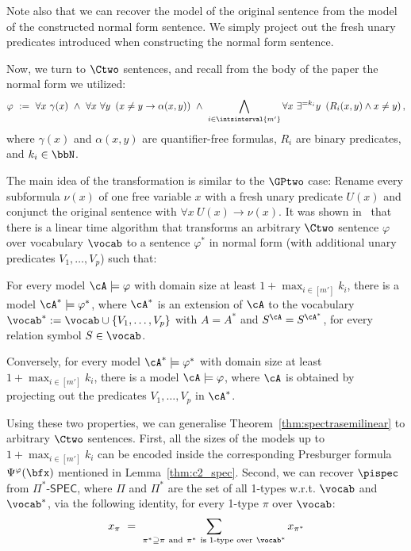 Note also that we can recover the model of the original sentence from the model of the constructed normal form sentence.
We simply project out the fresh unary predicates introduced when constructing the normal form sentence. 

Now, we turn to $\Ctwo$ sentences, and recall from the body of the paper the normal form we utilized:
\begin{equation*}
    \varphi\ :=\ 
    \forall x\ \gamma(x)\ \land\ 
    \forall x\ \forall y\ \left(x \neq y \to \alpha(x, y)\right)\ \land\ 
    \bigwedge_{i \in \intsinterval{m'}} \forall x\ \exists^{=k_i} y\ \left(R_i(x,y) \land x \neq y\right),
\end{equation*}
where $\gamma(x)$ and $\alpha(x, y)$ are quantifier-free formulas,
$R_i$ are binary predicates,
and $k_i \in \bbN$.
 
The main idea of the transformation is similar to the $\GPtwo$ case:
Rename every subformula $\nu(x)$ of one free variable $x$ with a fresh unary predicate $U(x)$ and conjunct the original sentence with $\forall x\  U(x)\to \nu(x)$.
It was shown in~\cite{ctwocomplexity,ianrevisited} that there is a linear time algorithm that transforms
an arbitrary $\Ctwo$ sentence $\varphi$ over vocabulary $\vocab$ to a sentence $\varphi^*$ in normal form (with additional unary predicates $V_1,\ldots,V_p$) such that:
\begin{compactitem}
\item 
For every model $\cA\models \varphi$ with domain size at least $1+\max_{i\in[m']}k_i$,
there is a model $\cA^*\models \varphi^*$, where $\cA^*$ is an extension of $\cA$ to the vocabulary $\vocab^*:=\vocab\cup\{V_1,\ldots,V_p\}$ with
$A=A^*$ and $S^{\cA}=S^{\cA^*}$, for every relation symbol $S\in\vocab$.
\item
Conversely,
for every model $\cA^*\models \varphi^*$ with domain size at least $1+\max_{i\in[m']}k_i$,
there is a model $\cA\models \varphi$, where $\cA$ is obtained by projecting out the predicates $V_1,\ldots,V_p$ in $\cA^*$.
\end{compactitem}
Using these two properties, we can generalise Theorem~\ref{thm:spectrasemilinear} to arbitrary $\Ctwo$ sentences.
First, all the sizes of the models up to 
$1+\max_{i\in [m']} k_i$ can be encoded inside the corresponding Presburger formula $\Psi^\varphi(\bfx)$
mentioned in Lemma~\ref{thm:c2_spec}.
Second, we can recover $\pispec$ from $\Pi^*\textsf{-SPEC}$,
where $\Pi$ and $\Pi^*$ are the set of all 1-types w.r.t. $\vocab$ and $\vocab^*$,
via the following identity, for every 1-type $\pi$ over $\vocab$:
$$
x_{\pi} \ = \
\sum_{\pi^*\supseteq \pi \ \text{and}\ \pi^*\ \text{is 1-type over}\ \vocab^*} x_{\pi^*}
$$

